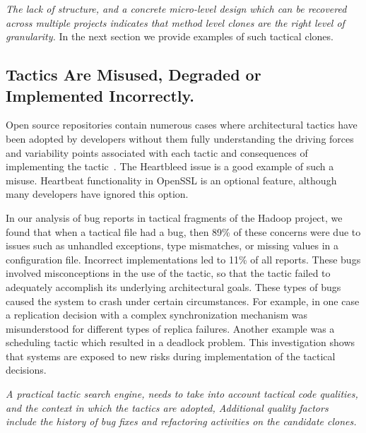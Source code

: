 \textit{The lack of structure, and a concrete micro-level design which can be recovered across multiple projects indicates that method level clones are the right level of granularity.} In the next section we provide examples of such tactical clones.

\subsection{Tactics Are Misused, Degraded or Implemented Incorrectly.} 

Open source repositories contain numerous cases where architectural tactics have been adopted by developers without them fully understanding the driving forces and variability points associated with each tactic and consequences of implementing the tactic~\cite{FSE2012}. The Heartbleed issue is a good example of such a misuse. Heartbeat functionality in OpenSSL is an optional feature, although many developers have ignored this option. %

In our analysis of bug reports in tactical fragments of the Hadoop project, we found that when a tactical file had a bug, then 89\% of these concerns were due to issues such as unhandled exceptions, type mismatches, or missing values in a configuration file. Incorrect implementations led to 11\% of all reports. These bugs involved misconceptions in the use of the tactic, so that the tactic failed to adequately accomplish its underlying architectural goals. These types of bugs caused the system to crash under certain circumstances. For example, in one case a replication decision with a complex synchronization mechanism was misunderstood for different types of replica failures. Another example was a scheduling tactic which resulted in a deadlock problem. This investigation shows that systems are exposed to new risks during implementation of the tactical decisions.

\textit{A practical tactic search engine, needs to take into account tactical code qualities, and the context in which the tactics are adopted, Additional quality factors include the history of bug fixes and refactoring activities on the candidate clones.}

